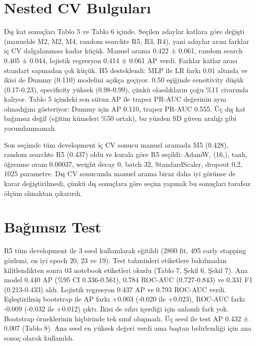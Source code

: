 \documentclass[10.5pt,a4paper]{article}
\newcommand{\tbl}[1]{}
\begin{document}
\section{Nested CV Bulguları}
Dış kat sonuçları Tablo 5 ve Tablo 6 içinde. Seçilen adaylar katlara göre değişti (manuelde M2, M2, M4, random searchte R5, R3, R4), yani adaylar arası farklar iç CV dalgalanması kadar küçük.
Manuel arama 0.422 ± 0.061, random search 0.405 ± 0.044, lojistik regresyon 0.414 ± 0.061 AP verdi. Farklar katlar arası standart sapmadan çok küçük. H5 desteklendi: MLP ile LR farkı 0.01 altında ve ikisi de Dummy (0.110) modelini açıkça geçiyor.
0.50 eşiğinde sensitivity düşük (0.17-0.23), specificity yüksek (0.98-0.99), çünkü olasılıkların çoğu \%11 civarında kalıyor.
Tablo 5 içindeki son sütun AP ile trapez PR-AUC değerinin aynı olmadığını gösteriyor: Dummy için AP 0.110, trapez PR-AUC 0.555.
Üç dış kat bağımsız değil (eğitim kümeleri \%50 ortak), bu yüzden SD güven aralığı gibi yorumlanmamalı.

\begin{table}[H]\centering\caption{Dış CV kat bazlı sonuçlar (eşik 0.50). İç AP seçilen adayın iç CV ortalaması. Değerler results/outer\_cv\_results.csv dosyasından.}\label{tab:outer}
\resizebox{.92\linewidth}{!}{\tbl{t4_outer_folds}}\end{table}
\begin{table}[H]\centering\caption{Dış CV özeti, ortalama ± örnek standart sapma (3 kat). outer\_cv\_results.csv üzerinden pandas std(ddof=1) ile hesapladım.}\label{tab:outerms}\small
\tbl{t5_outer_meansd}\end{table}

Son seçimde tüm development iç CV sonucu manuel aramada M5 (0.428), random searchte R5 (0.437) oldu ve kurala göre R5 seçildi: AdamW, (16,), tanh, öğrenme oranı 0.00037, weight decay 0, batch 32, StandardScaler, dropout 0.2, 1025 parametre. Dış CV sonucunda manuel arama biraz daha iyi görünse de karar değiştirilmedi, çünkü dış sonuçlara göre seçim yapmak bu sonuçları tarafsız ölçüm olmaktan çıkarırdı.

\section{Bağımsız Test}
R5 tüm development ile 3 seed kullanılarak eğitildi (2800 fit, 495 early stopping gözlemi, en iyi epoch 20, 23 ve 19). Test tahminleri etiketlere bakılmadan kilitlendikten sonra 03 notebook etiketleri okudu (Tablo 7, Şekil 6, Şekil 7).
Ana model 0.440 AP (\%95 CI 0.336-0.561), 0.784 ROC-AUC (0.727-0.843) ve 0.331 F1 (0.213-0.433) aldı. Lojistik regresyon 0.437 AP ve 0.793 ROC-AUC verdi.
Eşleştirilmiş bootstrap ile AP farkı +0.003 (-0.020 ile +0.023), ROC-AUC farkı -0.009 (-0.032 ile +0.012) çıktı. İkisi de sıfırı içerdiği için anlamlı fark yok. Bootstrap örneklerinin hiçbirinde tek sınıf oluşmadı.
Üç seed ile test AP 0.432 ± 0.007 (Tablo 8). Ana seed en yüksek değeri verdi ama baştan belirlendiği için ana sonuç olarak kullanıldı.
\end{document}
